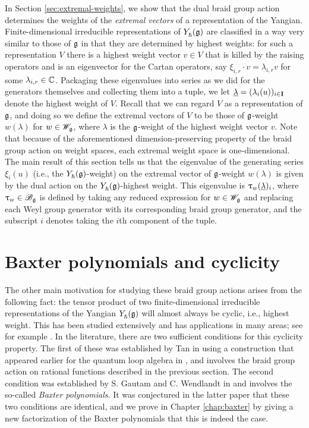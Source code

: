 In Section \ref{sec:extremal-weights}, we show that the dual braid group action determines the weights of the \emph{extremal vectors} of a representation of the Yangian.
Finite-dimensional irreducible representations of $Y_\hbar^{}(\mathfrak{g})$ are classified in a way very similar to those of $\mathfrak{g}$ in that they are determined by highest weights: for such a representation $V$ there is a highest weight vector $v\in V$ that is killed by the raising operators and is an eigenvector for the Cartan operators, say $\xi_{i,r}\cdot v = \lambda_{i,r}v$ for some $\lambda_{i,r}\in\mathbb{C}$.
Packaging these eigenvalues into series as we did for the generators themselves and collecting them into a tuple, we let $\underline{\lambda} = (\lambda_i(u))_{i\in\mathbf{I}}$ denote the highest weight of $V$.
Recall that we can regard $V$ as a representation of $\mathfrak{g}$, and doing so we define the extremal vectors of $V$ to be those of $\mathfrak{g}$-weight $w(\lambda)$ for $w\in\mathscr{W}_{\mathfrak{g}}$, where $\lambda$ is the $\mathfrak{g}$-weight of the highest weight vector $v$.
Note that because of the aforementioned dimension-preserving property of the braid group action on weight spaces, each extremal weight space is one-dimensional.
The main result of this section tells us that the eigenvalue of the generating series $\xi_i(u)$ (i.e., the $Y_\hbar^{}(\mathfrak{g})$-weight) on the extremal vector of $\mathfrak{g}$-weight $w(\lambda)$ is given by the dual action on the $Y_\hbar^{}(\mathfrak{g})$-highest weight. This eigenvalue is $\uptau_w(\underline{\lambda})_i$, where $\uptau_w\in\mathscr{B}_{\mathfrak{g}}$ is defined by taking any reduced expression for $w\in\mathscr{W}_{\mathfrak{g}}$ and replacing each Weyl group generator with its corresponding braid group generator, and the subscript $i$ denotes taking the $i$th component of the tuple.


\section{Baxter polynomials and cyclicity}

The other main motivation for studying these braid group actions arises from the following fact: the tensor product of two finite-dimensional irreducible representations of the Yangian $Y_\hbar^{}(\mathfrak{g})$ will almost always be cyclic, i.e., highest weight.
This has been studied extensively and has applications in many areas; see for example \cite{chari_yangians_1996, guay_local_2015, molev_yangians_2007, nazarov_irreducibility_2002, akasaka_finite_1997}.
In the literature, there are two sufficient conditions for this cyclicity property.
The first of these was established by Tan in \cite{tan_braid_2015} using a construction that appeared earlier for the quantum loop algebra in \cite{chari_braid_2002}, and involves the braid group action on rational functions described in the previous section.
The second condition was established by S. Gautam and C. Wendlandt in \cite{gautam_poles_2023} and involves the so-called \emph{Baxter polynomials}.
It was conjectured in the latter paper that these two conditions are identical, and we prove in Chapter \ref{chap:baxter} by giving a new factorization of the Baxter polynomials that this is indeed the case.

